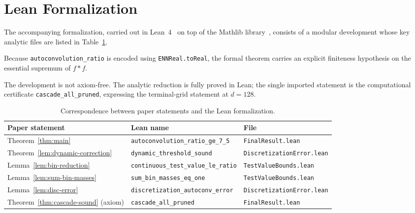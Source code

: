 \documentclass[11pt, letterpaper]{article}
\theoremstyle{paperplain}
\theoremstyle{paperdef}
\begin{document}
\section{Lean Formalization}\label{sec:formalization}

The accompanying formalization, carried out in
Lean~4~\cite{Lean4} on top of the Mathlib library~\cite{Mathlib},
consists of a modular development whose key analytic files are listed
in Table~\ref{tab:lean-map}.

Because \texttt{autoconvolution\_ratio} is encoded using
\texttt{ENNReal.toReal}, the formal theorem carries an explicit
finiteness hypothesis on the essential supremum of $f*f$.

The development is not axiom-free.  The analytic reduction is fully
proved in Lean; the single imported statement is the computational
certificate \texttt{cascade\_all\_pruned}, expressing the terminal-grid
statement at $d=128$.

\begin{table}[h]
\centering\small
\begin{tabular}{lll}
  \toprule
  \textbf{Paper statement} & \textbf{Lean name} & \textbf{File} \\
  \midrule
  Theorem~\ref{thm:main} & \texttt{autoconvolution\_ratio\_ge\_7\_5}
    & \texttt{FinalResult.lean} \\
  Theorem~\ref{lem:dynamic-correction} & \texttt{dynamic\_threshold\_sound}
    & \texttt{DiscretizationError.lean} \\
  Lemma~\ref{lem:bin-reduction} & \texttt{continuous\_test\_value\_le\_ratio}
    & \texttt{TestValueBounds.lean} \\
  Lemma~\ref{lem:sum-bin-masses} & \texttt{sum\_bin\_masses\_eq\_one}
    & \texttt{TestValueBounds.lean} \\
  Lemma~\ref{lem:disc-error} & \texttt{discretization\_autoconv\_error}
    & \texttt{DiscretizationError.lean} \\
  Theorem~\ref{thm:cascade-sound} (axiom) & \texttt{cascade\_all\_pruned}
    & \texttt{FinalResult.lean} \\
  \bottomrule
\end{tabular}
\caption{Correspondence between paper statements and the Lean formalization.}
\label{tab:lean-map}
\end{table}


\end{document}
